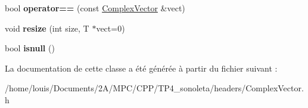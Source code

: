 \begin{DoxyCompactItemize}
\item 
\mbox{\label{class_complex_vector_a64571555c0493e67ab9f9db38f3b130e}} 
bool {\bfseries operator==} (const \hyperlink{class_complex_vector}{Complex\+Vector} \&vect)
\item 
\mbox{\label{class_complex_vector_aa0a282b16016accf4a4be0331e577c8f}} 
void {\bfseries resize} (int size, T $\ast$vect=0)
\item 
\mbox{\label{class_complex_vector_a1ae75445c227a6287e3246f98fc8ed68}} 
bool {\bfseries isnull} ()
\end{DoxyCompactItemize}


La documentation de cette classe a été générée à partir du fichier suivant \+:\begin{DoxyCompactItemize}
\item 
/home/louis/\+Documents/2\+A/\+M\+P\+C/\+C\+P\+P/\+T\+P4\+\_\+sonoleta/headers/Complex\+Vector.\+h\end{DoxyCompactItemize}
